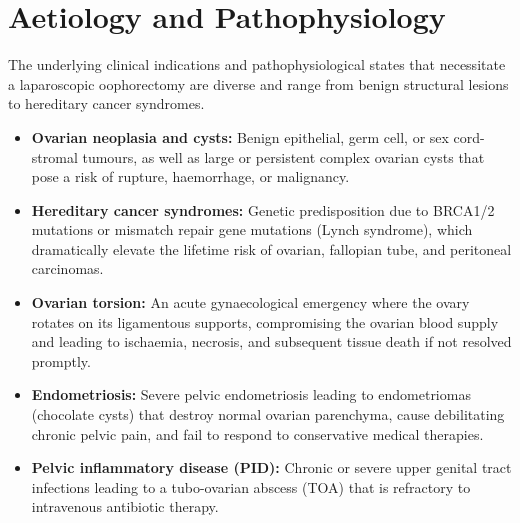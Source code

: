 \section*{Aetiology and Pathophysiology}
The underlying clinical indications and pathophysiological states that necessitate a laparoscopic oophorectomy are diverse and range from benign structural lesions to hereditary cancer syndromes.
\begin{itemize}
    \item \textbf{Ovarian neoplasia and cysts:} Benign epithelial, germ cell, or sex cord-stromal tumours, as well as large or persistent complex ovarian cysts that pose a risk of rupture, haemorrhage, or malignancy.
    \item \textbf{Hereditary cancer syndromes:} Genetic predisposition due to BRCA1/2 mutations or mismatch repair gene mutations (Lynch syndrome), which dramatically elevate the lifetime risk of ovarian, fallopian tube, and peritoneal carcinomas.
    \item \textbf{Ovarian torsion:} An acute gynaecological emergency where the ovary rotates on its ligamentous supports, compromising the ovarian blood supply and leading to ischaemia, necrosis, and subsequent tissue death if not resolved promptly.
    \item \textbf{Endometriosis:} Severe pelvic endometriosis leading to endometriomas (chocolate cysts) that destroy normal ovarian parenchyma, cause debilitating chronic pelvic pain, and fail to respond to conservative medical therapies.
    \item \textbf{Pelvic inflammatory disease (PID):} Chronic or severe upper genital tract infections leading to a tubo-ovarian abscess (TOA) that is refractory to intravenous antibiotic therapy.
\end{itemize}

